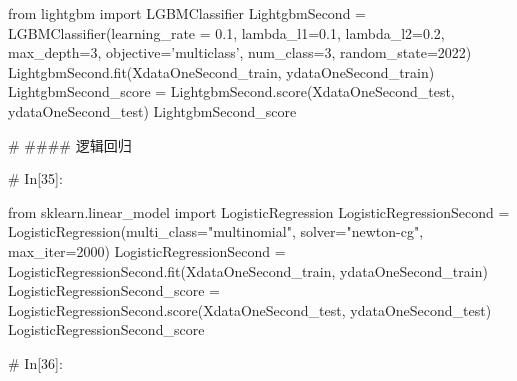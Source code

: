 \documentclass{MathorCupmodeling}
\begin{document}
\begin{python}
from lightgbm import LGBMClassifier
LightgbmSecond = LGBMClassifier(learning_rate = 0.1,
                                lambda_l1=0.1,
                                lambda_l2=0.2,
                                max_depth=3,
                                objective='multiclass',
                                num_class=3,
                                random_state=2022)
LightgbmSecond.fit(XdataOneSecond_train, ydataOneSecond_train)
LightgbmSecond_score = LightgbmSecond.score(XdataOneSecond_test, ydataOneSecond_test)
LightgbmSecond_score


# #### 逻辑回归

# In[35]:


from sklearn.linear_model import LogisticRegression
LogisticRegressionSecond = LogisticRegression(multi_class="multinomial", solver="newton-cg", max_iter=2000)
LogisticRegressionSecond = LogisticRegressionSecond.fit(XdataOneSecond_train, ydataOneSecond_train)
LogisticRegressionSecond_score = LogisticRegressionSecond.score(XdataOneSecond_test, ydataOneSecond_test)
LogisticRegressionSecond_score


# In[36]:



\end{python}
\end{document}
